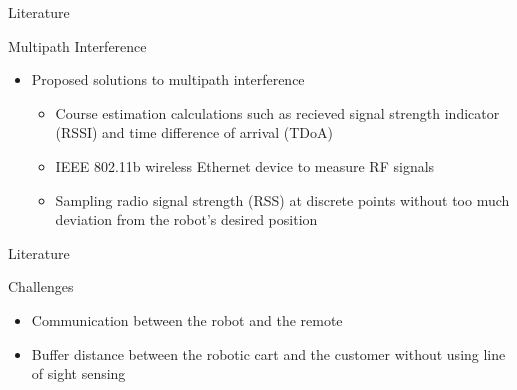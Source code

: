 \documentclass{beamer}
\begin{document}

\begin{frame}{Literature}
  \begin{block}{Multipath Interference}
    \begin{itemize}
        \item Proposed solutions to multipath interference
            \begin{itemize}
                \item Course estimation calculations such as recieved signal strength indicator (RSSI) and time difference of arrival (TDoA)
                \item IEEE 802.11b wireless Ethernet device to measure RF signals
                \item Sampling radio signal strength (RSS) at discrete points without too much deviation from the robot's desired position
            \end{itemize}
    \end{itemize}
  \end{block}
\end{frame}


\begin{frame}{Literature}
  \begin{block}{Challenges}
    \begin{itemize}
        \item Communication between the robot and the remote
        \item Buffer distance between the robotic cart and the customer without using line of sight sensing
    \end{itemize}
  \end{block}
\end{frame}
\end{document}
